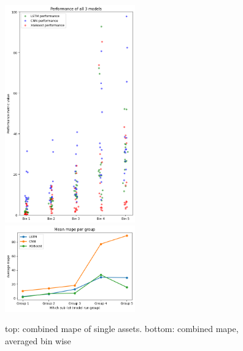 \documentclass[a4paper,12pt]{report}
\begin{document}
\begin{figure}
  \includegraphics[width=0.5\textwidth]{images/results_combined.png}
  \includegraphics[width=0.5\textwidth]{images/results_averaged.png}
  \caption{top: combined mape of single assets. bottom: combined mape, averaged bin wise}
  \label{fig:wrapped}
\end{figure}
\end{document}
